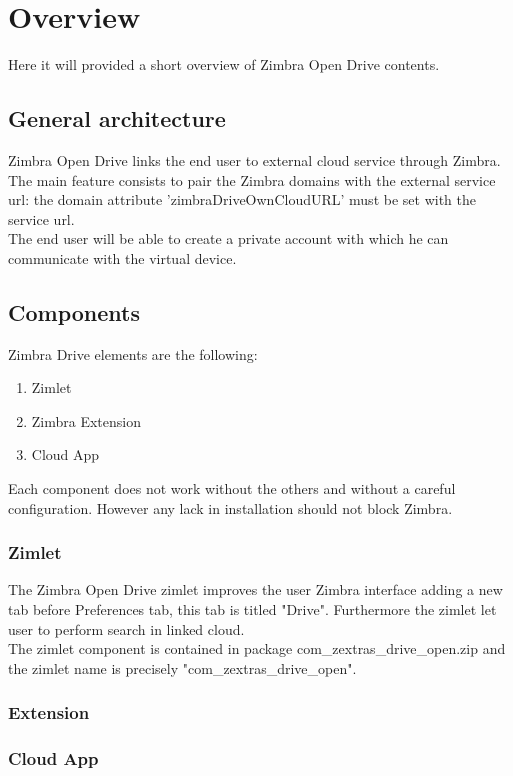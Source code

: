 \section{Overview}
    Here it will provided a short overview of Zimbra Open Drive contents. 

    \subsection{General architecture}
    Zimbra Open Drive links the end user to external cloud service through Zimbra.
    The main feature consists to pair the Zimbra domains with the external service url:
    the domain attribute 'zimbraDriveOwnCloudURL' must be set with the service url.\\
    The end user will be able to create a private account with which he can communicate with
    the virtual device.

    \subsection{Components}
    Zimbra Drive elements are the following:
    \begin{enumerate}
        \item Zimlet
        \item Zimbra Extension
        \item Cloud App
    \end{enumerate}
    \begin{warning}
        Each component does not work without the others and without a careful configuration.
        However any lack in installation should not block Zimbra.
    \end{warning}

        \subsubsection{Zimlet}
        The Zimbra Open Drive zimlet improves the user Zimbra interface adding a new tab before Preferences tab,
        this tab is titled "Drive". Furthermore the zimlet let user to perform search in linked cloud.\\
        The zimlet component is contained in package com\_zextras\_drive\_open.zip and the zimlet name is precisely
        "com\_zextras\_drive\_open".

        \subsubsection{Extension}

        \subsubsection{Cloud App}
